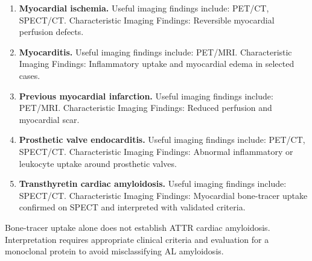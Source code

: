 \begin{enumerate}[leftmargin=*,itemsep=0.45em,topsep=0.4em]
\item \textbf{Myocardial ischemia.} Useful imaging findings include: PET/CT, SPECT/CT. Characteristic Imaging Findings: Reversible myocardial perfusion defects.
\item \textbf{Myocarditis.} Useful imaging findings include: PET/MRI. Characteristic Imaging Findings: Inflammatory uptake and myocardial edema in selected cases.
\item \textbf{Previous myocardial infarction.} Useful imaging findings include: PET/MRI. Characteristic Imaging Findings: Reduced perfusion and myocardial scar.
\item \textbf{Prosthetic valve endocarditis.} Useful imaging findings include: PET/CT, SPECT/CT. Characteristic Imaging Findings: Abnormal inflammatory or leukocyte uptake around prosthetic valves.
\item \textbf{Transthyretin cardiac amyloidosis.} Useful imaging findings include: SPECT/CT. Characteristic Imaging Findings: Myocardial bone-tracer uptake confirmed on SPECT and interpreted with validated criteria.
\end{enumerate}

Bone-tracer uptake alone does not establish ATTR cardiac amyloidosis. Interpretation requires appropriate clinical criteria and evaluation for a monoclonal protein to avoid misclassifying AL amyloidosis.

